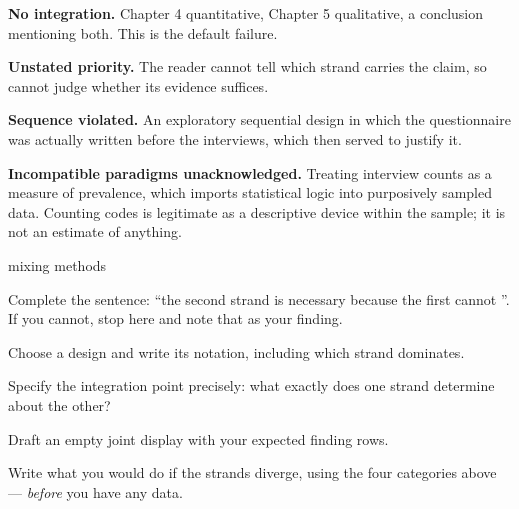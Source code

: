 \begin{pitfall}
\begin{tight}
  \item \textbf{No integration.} Chapter 4 quantitative, Chapter 5 qualitative,
    a conclusion mentioning both. This is the default failure.
  \item \textbf{Unstated priority.} The reader cannot tell which strand carries
    the claim, so cannot judge whether its evidence suffices.
  \item \textbf{Sequence violated.} An exploratory sequential design in which
    the questionnaire was actually written before the interviews, which then
    served to justify it.
  \item \textbf{Incompatible paradigms unacknowledged.} Treating interview
    counts as a measure of prevalence, which imports statistical logic into
    purposively sampled data. Counting codes is legitimate as a descriptive
    device within the sample; it is not an estimate of anything.
\end{tight}
\end{pitfall}

\begin{traditions}{mixing methods}
\end{traditions}

\begin{lab}
\begin{tightnum}
  \item Complete the sentence: ``the second strand is necessary because the
    first cannot \underline{\hspace{25mm}}''. If you cannot, stop here and note
    that as your finding.
  \item Choose a design and write its notation, including which strand
    dominates.
  \item Specify the integration point precisely: what exactly does one strand
    determine about the other?
  \item Draft an empty joint display with your expected finding rows.
  \item Write what you would do if the strands diverge, using the four
    categories above --- \emph{before} you have any data.
\end{tightnum}
\end{lab}

